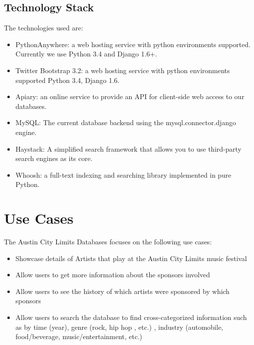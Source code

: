 \documentclass[12pt,english]{scrartcl}
\begin{document}
\subsection{Technology Stack}
The technologies used are:
\begin{itemize}
 \item PythonAnywhere: a web hosting service with python environments supported. Currently we use Python 3.4 and Django 1.6+.
\end{itemize}
\begin{itemize}
 \item Twitter Bootstrap 3.2: a web hosting service with python environments supported Python 3.4, Django 1.6.
\end{itemize}
\begin{itemize}
 \item Apiary: an online service to provide an API for client-side web access to our databases.
\end{itemize}
\begin{itemize}
 \item MySQL: The current database backend using the mysql.connector.django engine.
\end{itemize}
\begin{itemize}
 \item Haystack: A simplified search framework that allows you to use third-party search engines as its core.
 \end{itemize}
\begin{itemize}
 \item Whoosh: a full-text indexing and searching library implemented in pure Python.
\end{itemize}

\section{Use Cases}
The Austin City Limits Databases focuses on the following use cases:
\begin{itemize}
 \item Showcase details of Artists that play at the Austin City Limits music festival
 \item Allow users to get more information about the sponsors involved 
 \item Allow users to see the history of which artists were sponsored by which sponsors 
 \item Allow users to search the database to find cross-categorized information such as by time (year), genre (rock, hip hop , etc.)
 , industry (automobile, food/beverage, music/entertainment, etc.)
\end{itemize}
\end{document}

